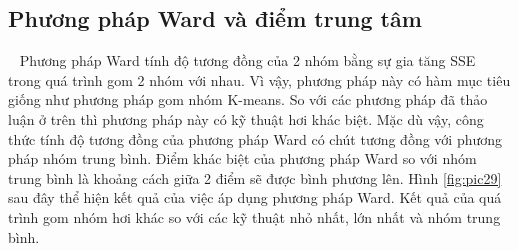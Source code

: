 \subsection{Phương pháp Ward và điểm trung tâm}
~\cite{Vipin-Kumar, AHC, hierarchical-clustering} Phương pháp Ward tính độ tương đồng của 2 nhóm bằng sự gia tăng SSE ~\cite{SSE} trong quá trình gom 2 nhóm với nhau.
Vì vậy, phương pháp này có hàm mục tiêu giống như phương pháp gom nhóm K-means.
So với các phương pháp đã thảo luận ở trên thì phương pháp này có kỹ thuật hơi khác biệt.
Mặc dù vậy, công thức tính độ tương đồng của phương pháp Ward có chút tương đồng với phương pháp nhóm trung bình.
Điểm khác biệt của phương pháp Ward so với nhóm trung bình là khoảng cách giữa 2 điểm sẽ được bình phương lên.
Hình \ref{fig:pic29} sau đây thể hiện kết quả của việc áp dụng phương pháp Ward. Kết quả của quá trình gom nhóm hơi khác so với các kỹ thuật nhỏ nhất, lớn nhất và nhóm trung bình.

